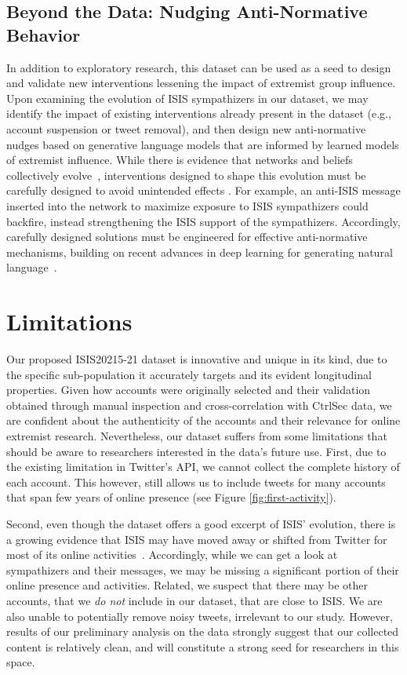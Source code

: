 \documentclass[letterpaper]{article} %
\begin{document}
 \subsection{Beyond the Data: Nudging Anti-Normative Behavior}
In addition to exploratory research, this dataset can be used as a seed  to design and validate new interventions lessening the impact of extremist group influence. Upon  examining the evolution of ISIS sympathizers in our dataset,  we may  identify the impact of existing interventions already present in the dataset (e.g., account suspension or tweet removal), and then design new anti-normative nudges based on generative language models that are informed by learned models of extremist influence.
While there is evidence that networks and beliefs collectively evolve~\cite{lazer2010coevolution}, interventions designed to shape this evolution must be carefully designed to avoid unintended effects  \cite{Bail9216,nyhan2010corrections}.  For example, an anti-ISIS message  inserted into the network to maximize exposure to ISIS sympathizers could backfire, instead strengthening the ISIS support of the sympathizers. Accordingly, carefully designed solutions must be engineered for effective  anti-normative mechanisms, building on recent advances in deep learning for generating natural language~\cite{DBLP:journals/corr/BowmanVVDJB15,DBLP:journals/corr/abs-1708-02709}.


\section{Limitations}
Our proposed ISIS20215-21 dataset  is innovative and unique in its kind, due to the specific sub-population it accurately targets and its evident longitudinal properties. Given how accounts were originally selected and their validation obtained through manual inspection and cross-correlation with CtrlSec data, we are confident about the authenticity of the accounts and their relevance for online extremist research.
Nevertheless, our dataset suffers from some limitations that should be aware to researchers interested in the data's future use.  First,  due to the existing limitation in Twitter's API, we cannot collect the complete history of each account. This however, still allows us  to include tweets for many accounts that span few years of online presence (see Figure \ref{fig:first-activity}).

Second,  even though the dataset offers a good excerpt of ISIS' evolution, there is a growing evidence that ISIS may have moved away or shifted  from Twitter for most of its online activities~\cite{voxpol}. Accordingly, while we can get a look at sympathizers and their messages, we may be missing a significant portion of their online presence and activities. Related, we suspect that there may be  other  accounts, that we \textit{do not }include in our dataset, that are close to ISIS.  We are also unable to potentially remove noisy tweets, irrelevant to our study. However, results of our preliminary analysis on the data strongly suggest that our collected content is relatively clean, and  will constitute a strong  seed    for researchers in this space.
\end{document}
